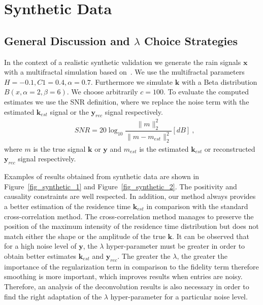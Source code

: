 \documentclass[]{elsarticle} %
\begin{document}
\section{Synthetic Data}
\label{sec:synthetic}

\subsection{General Discussion and \texorpdfstring{$\lambda$}{lambda} Choice Strategies}

In the context of a realistic synthetic validation we generate the rain signals $\textbf{x}$ with a multifractal simulation based on~\cite{Z_Hydro_Tessier1996b}. We use the multifractal parameters $H=-0.1,C1=0.4,\alpha=0.7$.
Furthermore we simulate  $\textbf{k}$  with a Beta distribution $B(x,\alpha=2,\beta=6)$.
We choose arbitrarily $c =  100$. To evaluate the computed estimates we use the SNR definition, where we replace the noise term with the estimated $\textbf{k}_{est}$ signal or the $\textbf{y}_{rec}$ signal respectively.
\begin{equation}\label{11}
\begin{aligned}
&SNR = 20 \log_{10}\dfrac{\|m\|_{2}^{2}}{\|m - m_{est}\|_{2}^{2} }[dB]\ ,
\end{aligned}
\end{equation}
where $m$ is the true signal $\textbf{k}$ or $\textbf{y}$ and $m_{est}$ is the estimated $\textbf{k}_{est}$ or reconstructed $\textbf{y}_{rec}$ signal respectively.

Examples of results obtained from synthetic data are shown in Figure~\ref{fig_synthetic_1} and Figure~\ref{fig_synthetic_2}.
The positivity and causality constraints are well respected. In addition, our method always provides a better estimation of the residence time $\textbf{k}_{est}$ in comparison with the standard cross-correlation method. The cross-correlation method manages to preserve the position of the maximum intensity of the residence time distribution but does not match either the shape or the amplitude of the true $\textbf{k}$.
It can be observed that for a high noise level of $\textbf{y}$, the $\lambda$ hyper-parameter must be greater in order to obtain better estimates $\textbf{k}_{est}$ and $\textbf{y}_{rec}$. The greater the $\lambda$, the greater the importance of the regularization term in comparison to the fidelity term therefore smoothing is more important, which improves results when entries are noisy. Therefore, an analysis of the deconvolution results is also necessary in order to find the right adaptation of the $\lambda$ hyper-parameter for a particular noise level. 
\end{document}
